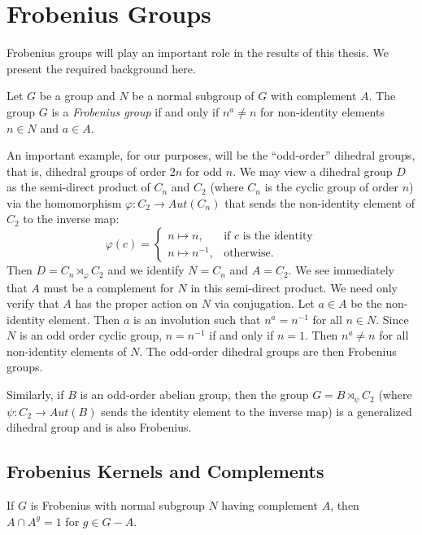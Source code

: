\documentclass[main.tex]{subfiles}
\begin{document}
\section{Frobenius Groups}

Frobenius groups will play an important role in the results of this thesis. We present the required background here.

\hss

\begin{definition}
Let $G$ be a group and $N$ be a normal subgroup of $G$ with complement $A$. The group $G$ is a \emph{Frobenius group} if and only if $n^a \ne n$ for non-identity elements $n \in N$ and $a \in A$.
\end{definition}

\hss

An important example, for our purposes, will be the ``odd-order'' dihedral groups, that is, dihedral groups of order $2n$ for odd $n$. We may view a dihedral group $D$ as the semi-direct product of $C_n$ and $C_2$ (where $C_n$ is the cyclic group of order $n$) via the homomorphism $\varphi: C_2 \to Aut(C_n)$ that sends the non-identity element of $C_2$ to the inverse map:
\[
    \varphi(c)=
    \begin{cases}
        n \mapsto n, & \text{if $c$ is the identity} \\
        n \mapsto n^{-1}, & \text{otherwise.}
    \end{cases}
\]
Then $D = C_n \rtimes_{\varphi} C_2$ and we identify $N = C_n$ and $A = C_2$. We see immediately that $A$ must be a complement for $N$ in this semi-direct product. We need only verify that $A$ has the proper action on $N$ via conjugation. Let $a \in A$ be the non-identity element. Then $a$ is an involution such that $n^a = n^{-1}$ for all $n \in N$. Since $N$ is an odd order cyclic group, $n = n^{-1}$ if and only if $n = 1$. Then $n^a \ne n$ for all non-identity elements of $N$. The odd-order dihedral groups are then Frobenius groups.

Similarly, if $B$ is an odd-order abelian group, then the group $G = B \rtimes_\psi C_2$ (where $\psi: C_2 \to Aut(B)$ sends the identity element to the inverse map) is a generalized dihedral group and is also Frobenius.

\subsection{Frobenius Kernels and Complements}

\begin{lemma}
If $G$ is Frobenius with normal subgroup $N$ having complement $A$, then $A \cap A^g = 1$ for $g \in G - A$.
\end{lemma}
\end{document}
